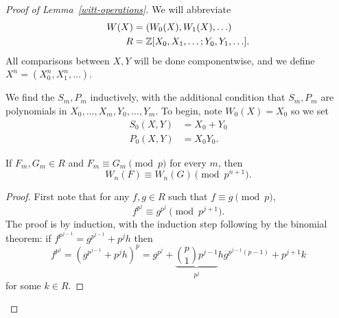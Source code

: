 \begin{proof}[Proof of Lemma~\ref{witt-operations}]
We will abbreviate
\begin{align*}
W(X)&=(W_0(X),W_1(X),\ldots)\\
R&=\mathbb{Z}[X_0,X_1,\ldots;Y_0,Y_1,\ldots].
\end{align*}
All comparisons between $X,Y$ will be done componentwise, and we define $X^n=(X_0^n,X_1^n,\ldots)$.

We find the $S_m,P_m$ inductively, with the additional condition that $S_m,P_m$ are polynomials in $X_0,\ldots, X_m,Y_0,\ldots, Y_m$. To begin, note $W_0(X)=X_0$ so we set
\begin{align*}
S_0(X,Y)&=X_0+Y_0\\
P_0(X,Y)&=X_0Y_0.
\end{align*}
\begin{lem}
If $F_m,G_m\in R$ and $F_m\equiv G_m\pmod{p}$ for every $m$, then
\[
W_n(F)\equiv W_n(G)\pmod{p^{n+1}}.
\]
\end{lem}
\begin{proof}
First note that for any $f,g\in R$ such that $f\equiv g\pmod{p}$,
\[
f^{p^j}\equiv g^{p^j}\pmod{p^{j+1}}.
\]
The proof is by induction, with the induction step following by the binomial theorem: if $f^{p^{j-1}}=g^{p^{j-1}}+p^{j}h$ then
\[
f^{p^j}=(g^{p^{j-1}}+p^jh)^p=g^{p^j}+\underbrace{\binom p1p^{j-1}}_{p^j}hg^{p^{j-1}(p-1)}+p^{j+1}k
\]
for some $k\in R$.


\end{proof}
\end{proof}
